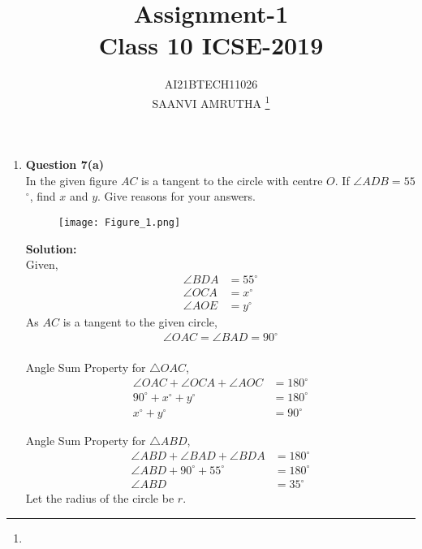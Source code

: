 \documentclass[journal,12pt,twocolumn]{IEEEtran}
\begin{document}
\let\vec\mathbf
\renewcommand{\thefigure}{\theproblem}
\def\putbox#1#2#3{\makebox[0in][l]{\makebox[#1][l]{}\raisebox{\baselineskip}[0in][0in]{\raisebox{#2}[0in][0in]{#3}}}}
     \def\rightbox#1{\makebox[0in][r]{#1}}
     \def\centbox#1{\makebox[0in]{#1}}
     \def\topbox#1{\raisebox{-\baselineskip}[0in][0in]{#1}}
     \def\midbox#1{\raisebox{-0.5\baselineskip}[0in][0in]{#1}}
\vspace{3cm}
\title{ Assignment-1\\Class 10 ICSE-2019}
\author{AI21BTECH11026\\SAANVI AMRUTHA
	\thanks{}
}
\maketitle
\newpage
\bigskip
\begin{enumerate}[label= ,ref= ]
\item \textbf{Question 7(a)}\\ 
In the given figure $AC$ is a tangent to the circle with centre $O$. If $\angle$$ADB=55$$^{\circ}$, find $x$ and $y$. Give reasons for your answers.\\
\begin{figure}[h]
\texttt{[image: Figure\_1.png]}
\label{Fig}
\end{figure}

\textbf{Solution:} \\
Given,\\
  \begin{align}
\angle BDA&=55^\circ \\ 
\angle OCA&=x^\circ\\
 \angle AOE&=y^\circ
 \end{align} 
As $AC$ is a tangent to the given circle, 
\begin{align} 
\angle OAC=\angle BAD=90^\circ
\end{align} 
\\
Angle Sum Property for $\triangle OAC$, 
        \begin{align}
           \angle OAC+\angle OCA+\angle AOC&=180^\circ \\
             90^\circ+x^\circ+y^\circ&=180^\circ\\
          x^\circ+y^\circ&=90^\circ
               \end{align} 
             
               
Angle Sum Property for $\triangle ABD$,    
\begin{align}
               \angle ABD+\angle BAD+\angle BDA&=180^\circ\\
               \angle ABD+90^\circ+55^\circ&=180^\circ\\
               \angle ABD&=35^\circ
 \end{align}  
 Let the radius of the circle be $r$.\\


\end{enumerate}
\end{document}

